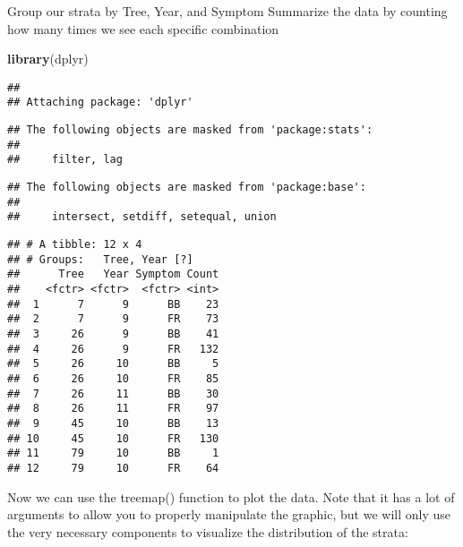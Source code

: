 \documentclass[12pt,]{krantz}
\newenvironment{Shaded}{\begin{snugshade}}{\end{snugshade}}
\newcommand{\KeywordTok}[1]{\textcolor[rgb]{0.27,0.27,0.27}{\textbf{#1}}}
\newcommand{\DataTypeTok}[1]{\textcolor[rgb]{0.27,0.27,0.27}{#1}}
\newcommand{\StringTok}[1]{\textcolor[rgb]{0.5,0.5,0.5}{#1}}
\newcommand{\OperatorTok}[1]{\textcolor[rgb]{0.81,0.36,0.00}{\textbf{#1}}}
\newcommand{\NormalTok}[1]{#1}
\theoremstyle{definition}
\theoremstyle{definition}
\theoremstyle{definition}
\theoremstyle{remark}
\begin{document}
Group our strata by Tree, Year, and Symptom Summarize the data by
counting how many times we see each specific combination

\begin{Shaded}
\begin{Highlighting}[]
\KeywordTok{library}\NormalTok{(dplyr)}
\end{Highlighting}
\end{Shaded}

\begin{verbatim}
## 
## Attaching package: 'dplyr'
\end{verbatim}

\begin{verbatim}
## The following objects are masked from 'package:stats':
## 
##     filter, lag
\end{verbatim}

\begin{verbatim}
## The following objects are masked from 'package:base':
## 
##     intersect, setdiff, setequal, union
\end{verbatim}

\begin{Shaded}
\end{Shaded}

\begin{verbatim}
## # A tibble: 12 x 4
## # Groups:   Tree, Year [?]
##      Tree   Year Symptom Count
##    <fctr> <fctr>  <fctr> <int>
##  1      7      9      BB    23
##  2      7      9      FR    73
##  3     26      9      BB    41
##  4     26      9      FR   132
##  5     26     10      BB     5
##  6     26     10      FR    85
##  7     26     11      BB    30
##  8     26     11      FR    97
##  9     45     10      BB    13
## 10     45     10      FR   130
## 11     79     10      BB     1
## 12     79     10      FR    64
\end{verbatim}

Now we can use the treemap() function to plot the data. Note that it has
a lot of arguments to allow you to properly manipulate the graphic, but
we will only use the very necessary components to visualize the
distribution of the strata:
\end{document}
